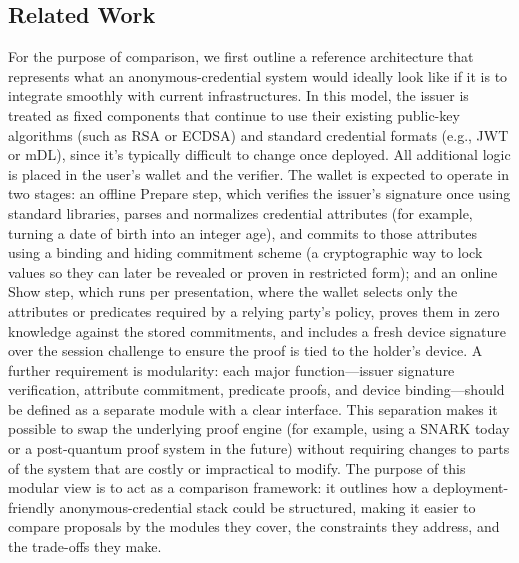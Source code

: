 \subsection{Related Work}

For the purpose of comparison, we first outline a reference architecture that represents what an anonymous-credential system would ideally look like if it is to integrate smoothly with current infrastructures. In this model, the issuer is treated as fixed components that continue to use their existing public-key algorithms (such as RSA or ECDSA) and standard credential formats (e.g., JWT or mDL), since it's typically difficult to change once deployed. All additional logic is placed in the user’s wallet and the verifier.
The wallet is expected to operate in two stages: an offline Prepare step, which verifies the issuer’s signature once using standard libraries, parses and normalizes credential attributes (for example, turning a date of birth into an integer age), and commits to those attributes using a binding and hiding commitment scheme (a cryptographic way to lock values so they can later be revealed or proven in restricted form); and an online Show step, which runs per presentation, where the wallet selects only the attributes or predicates required by a relying party’s policy, proves them in zero knowledge against the stored commitments, and includes a fresh device signature over the session challenge to ensure the proof is tied to the holder’s device.
A further requirement is modularity: each major function---issuer signature verification, attribute commitment, predicate proofs, and device binding---should be defined as a separate module with a clear interface. This separation makes it possible to swap the underlying proof engine (for example, using a SNARK today or a post-quantum proof system in the future) without requiring changes to parts of the system that are costly or impractical to modify. The purpose of this modular view is to act as a comparison framework: it outlines how a deployment-friendly anonymous-credential stack could be structured, making it easier to compare proposals by the modules they cover, the constraints they address, and the trade-offs they make.

